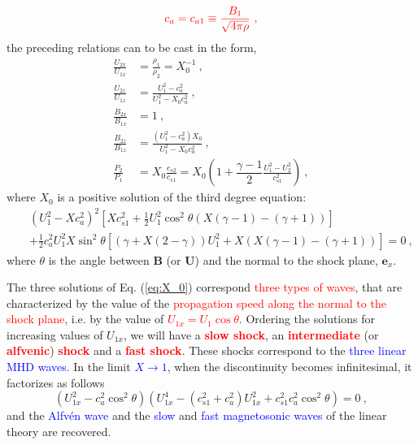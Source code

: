 \documentclass[12pt,a4paper]{article}
\renewcommand{\vec}[1]{\boldsymbol{#1}}
\begin{document}
\begin{equation*}
\color{red} c_a = c_{a1} \equiv \frac{B_1}{\sqrt{4\pi \rho}} ~,
\end{equation*}
the preceding relations can to be cast in the form,
\begin{align}
\frac{U_{2x} }{U_{1x} } &= \frac{\rho_1 }{\rho_{2} } = X_0^{-1} ~, \label{eq:dht_1} \\
\frac{U_{2z} }{U_{1z} } &= \frac{U_1^2-c_a^2 }{U_1^{2} -X_0 c_a^2} ~, \label{eq:dht_2} \\
\frac{B_{2x} }{B_{1x} } &= 1 ~, \label{eq:dht_3} \\
\frac{B_{2z} }{B_{1z} } &=  \frac{(U_1^2-c_a^2)X_0}{U_1^{2} -X_0 c_a^2} ~, \label{eq:dht_4} \\
\frac{P_2 }{P_1} &= X_0 \frac{c_{s2} }{c_{s1} } = X_0 \left(1+\dfrac{\gamma-1}{2} \frac{U_1^2-U_2^2 }{c_{s1}^2} \right) ~, \label{eq:dht_5}
\end{align}
where $X_0$ is a positive solution of the third degree equation:
\begin{eqnarray}
\nonumber && \left(U_1^2 -X c_a^2\right)^2 \left[X c_{s1}^2 +\frac{1}{2}U_1^2 \cos^2 \theta \left(X(\gamma -1) -(\gamma+1) \right) \right] \\
&& +\frac{1}{2} c_a^2 U_1^2 X \sin^2 \theta \left[\left(\gamma +X(2-\gamma) \right)U_1^2 +X\left(X(\gamma -1) -(\gamma +1) \right)\right] = 0 ~,
\label{eq:X_0}
\end{eqnarray}
where $\theta$ is the angle between $\vec{B}$ (or $\vec{U}$) and the normal to the shock plane, $\vec{e}_x$. 

The three solutions of Eq. (\ref{eq:X_0}) correspond  \textcolor{red}{three types of waves}, that are characterized by the value of the \textcolor{red}{propagation speed along the normal to the shock plane}, i.e. by the value of \textcolor{red}{$U_{1x} = U_1 \cos \theta$}. Ordering the solutions for increasing values of $U_{1x}$, we will have a \textcolor{red}{\bf slow shock}, an \textcolor{red}{\bf intermediate} (or \textcolor{red}{\bf alfvenic}) \textcolor{red}{\bf shock} and a \textcolor{red}{\bf fast shock}. These shocks correspond to the \textcolor{blue}{three linear MHD waves}. In the limit \textcolor{blue}{$X\rightarrow 1$}, when the discontinuity becomes infinitesimal, it factorizes as follows
\begin{equation*}
\left(U_{1x}^2 -c_a^2 \cos^2 \theta \right)\left(U_{1x}^4 -\left(c_{s1}^2 +c_a^2 \right) U_{1x}^2 +c_{s1}^2 c_a^2 \cos^2 \theta \right) = 0 ~,
\end{equation*}
and the \textcolor{blue}{Alfv\'en wave} and the \textcolor{blue}{slow} and \textcolor{blue}{fast magnetosonic waves} of the linear theory are recovered.
\end{document}
